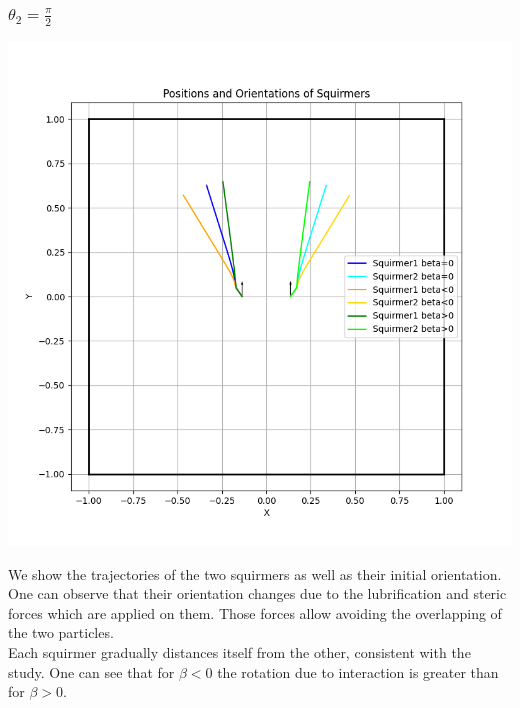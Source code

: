 \documentclass{article}
\begin{document}
\subsubsection{$\theta_2 = \frac{\pi}{2}$}
\begin{center}
   \includegraphics[width=1\textwidth]{graphs/simulations/twosquirmerinter/sq2.pi.2.png}
\end{center}
We show the trajectories of the two squirmers as well as their initial orientation.
One can observe that their orientation changes due to the lubrification and steric forces which are applied on them. 
Those forces allow avoiding the overlapping of the two particles.\\
Each squirmer gradually distances itself from the other,
 consistent with the study\cite{Stark}.
 One can see that for $\beta < 0$ the rotation due to interaction is greater
 than for $\beta > 0$.
\end{document}

